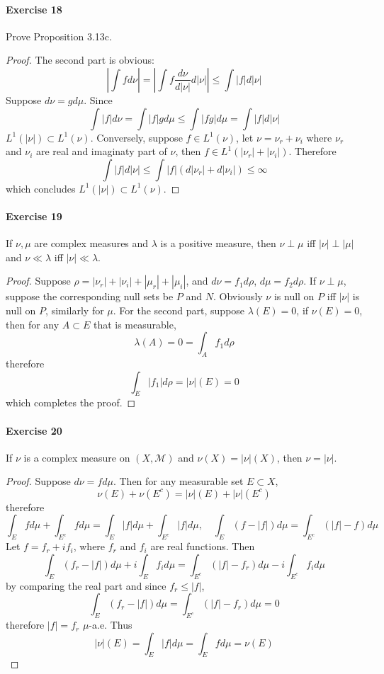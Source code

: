 \paragraph*{Exercise 18}
Prove Proposition 3.13c.
\begin{proof}
    The second part is obvious:
    $$
    \left|\int fd\nu\right|=\left|\int f\dfrac{d\nu}{d|\nu|}d|\nu|\right|\le\int\left|f\right|d|\nu|
    $$
    Suppose $d\nu=gd\mu$. Since 
    $$
    \int |f|d\nu=\int|f|gd\mu\le\int|fg|d\mu=\int |f|d|\nu|
    $$
    $L^1(|\nu|)\subset L^1(\nu)$. Conversely, suppose $f\in L^1(\nu)$, let $\nu=\nu_r+\nu_i$ where $\nu_r$ and $\nu_i$ are real and imaginaty part of $\nu$, then $f\in L^1(|\nu_r|+|\nu_i|)$. Therefore
    $$
    \int|f|d|\nu|\le\int|f|(d|\nu_r|+d|\nu_i|)\le\infty
    $$
    which concludes $L^1(|\nu|)\subset L^1(\nu)$.
\end{proof}
\paragraph*{Exercise 19}
If $\nu,\mu$ are complex measures and $\lambda$ is a positive measure, then $\nu\perp\mu$ iff $|\nu|\perp|\mu|$ and $\nu\ll\lambda$ iff $|\nu|\ll\lambda$.
\begin{proof}
    Suppose $\rho=|\nu_r|+|\nu_i|+|\mu_r|+|\mu_i|$, and $d\nu=f_1d\rho$, $d\mu=f_2d\rho$. If $\nu\perp\mu$, suppose the corresponding null sets be $P$ and $N$. Obviously $\nu$ is null on $P$ iff $|\nu|$ is null on $P$, similarly for $\mu$. For the second part, suppose $\lambda(E)=0$, if $\nu(E)=0$, then for any $A\subset E$ that is measurable,
    $$
    \lambda(A)=0=\int_Af_1d\rho
    $$
    therefore 
    $$
    \int_E|f_1|d\rho=|\nu|(E)=0
    $$
    which completes the proof.
\end{proof}
\paragraph*{Exercise 20}
If $\nu$ is a complex measure on $(X,\mathcal{M})$ and $\nu(X)=|\nu|(X)$, then $\nu=|\nu|$.
\begin{proof}
    Suppose $d\nu=fd\mu$. Then for any measurable set $E\subset X$,
    $$
    \nu(E)+\nu(E^c)=|\nu|(E)+|\nu|(E^c)
    $$
    therefore
    $$
    \int_Efd\mu+\int_{E^c}fd\mu=\int_E|f|d\mu+\int_{E^c}|f|d\mu,\quad \int_E(f-|f|)d\mu=\int_{E^c}(|f|-f)d\mu
    $$
    Let $f=f_r+if_i$, where $f_r$ and $f_i$ are real functions. Then
    $$
    \int_E(f_r-|f|)d\mu+i\int_Ef_id\mu=\int_{E^c}(|f|-f_r)d\mu-i\int_{E^c} f_id\mu
    $$
    by comparing the real part and since $f_r\le|f|$,
    $$
    \int_E(f_r-|f|)d\mu=\int_{E^c}(|f|-f_r)d\mu=0
    $$
    therefore $|f|=f_r$ $\mu$-a.e. Thus
    $$
    |\nu|(E)=\int_E|f|d\mu=\int_E fd\mu=\nu(E)
    $$
\end{proof}
